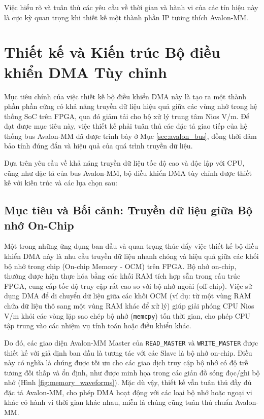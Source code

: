 Việc hiểu rõ và tuân thủ các yêu cầu về thời gian và hành vi của các tín hiệu này là cực kỳ quan trọng khi thiết kế một thành phần IP tương thích Avalon-MM.

\section{Thiết kế và Kiến trúc Bộ điều khiển DMA Tùy chỉnh}
\label{sec:dma_design_and_architecture} %
Mục tiêu chính của việc thiết kế bộ điều khiển DMA này là tạo ra một thành phần phần cứng có khả năng truyền dữ liệu hiệu quả giữa các vùng nhớ trong hệ thống SoC trên FPGA, qua đó giảm tải cho bộ xử lý trung tâm Nios V/m. Để đạt được mục tiêu này, việc thiết kế phải tuân thủ các đặc tả giao tiếp của hệ thống bus Avalon-MM đã được trình bày ở Mục \ref{sec:avalon_bus}, đồng thời đảm bảo tính đúng đắn và hiệu quả của quá trình truyền dữ liệu.

Dựa trên yêu cầu về khả năng truyền dữ liệu tốc độ cao và độc lập với CPU, cũng như đặc tả của bus Avalon-MM, bộ điều khiển DMA tùy chỉnh được thiết kế với kiến trúc và các lựa chọn sau:

\subsection{Mục tiêu và Bối cảnh: Truyền dữ liệu giữa Bộ nhớ On-Chip}
\label{subsec:dma_context_onchip}
Một trong những ứng dụng ban đầu và quan trọng thúc đẩy việc thiết kế bộ điều khiển DMA này là nhu cầu truyền dữ liệu nhanh chóng và hiệu quả giữa các khối bộ nhớ trong chip (On-chip Memory - OCM) trên FPGA. Bộ nhớ on-chip, thường được hiện thực hóa bằng các khối RAM tích hợp sẵn trong cấu trúc FPGA, cung cấp tốc độ truy cập rất cao so với bộ nhớ ngoài (off-chip). Việc sử dụng DMA để di chuyển dữ liệu giữa các khối OCM (ví dụ: từ một vùng RAM chứa dữ liệu thô sang một vùng RAM khác để xử lý) giúp giải phóng CPU Nios V/m khỏi các vòng lặp sao chép bộ nhớ (\texttt{memcpy}) tốn thời gian, cho phép CPU tập trung vào các nhiệm vụ tính toán hoặc điều khiển khác.

Do đó, các giao diện Avalon-MM Master của \texttt{READ\_MASTER} và \texttt{WRITE\_MASTER} được thiết kế với giả định ban đầu là tương tác với các Slave là bộ nhớ on-chip. Điều này có nghĩa là chúng được tối ưu cho các giao dịch truy cập bộ nhớ có độ trễ tương đối thấp và ổn định, như được minh họa trong các giản đồ sóng đọc/ghi bộ nhớ (Hình \ref{fig:memory_waveforms}). Mặc dù vậy, thiết kế vẫn tuân thủ đầy đủ đặc tả Avalon-MM, cho phép DMA hoạt động với các loại bộ nhớ hoặc ngoại vi khác có hành vi thời gian khác nhau, miễn là chúng cũng tuân thủ chuẩn Avalon-MM.

